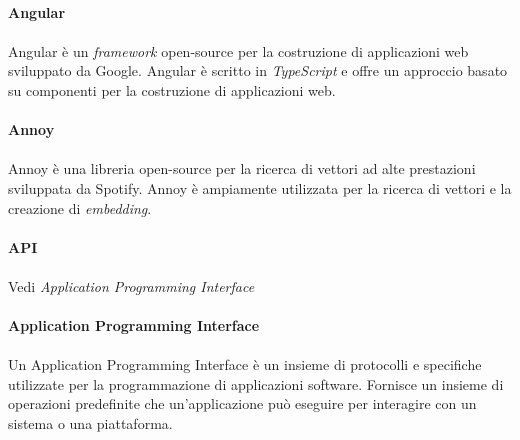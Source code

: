 \documentclass[10pt, a4paper]{article}
\begin{document}
\vspace{2em}
\paragraph{Angular}\noindent\hrulefill
\paragraph{}Angular è un \textit{framework\pg} open-source per la costruzione di applicazioni web sviluppato da Google. Angular è scritto in \textit{TypeScript\pg} e offre un approccio basato su componenti per la costruzione di applicazioni web.

\vspace{2em}
\paragraph{Annoy}\noindent\hrulefill
\paragraph{}Annoy è una libreria open-source per la ricerca di vettori ad alte prestazioni sviluppata da Spotify. Annoy è ampiamente utilizzata per la ricerca di vettori e la creazione di \textit{embedding\pg}.

\vspace{2em}
\paragraph{API}\noindent\hrulefill
\paragraph{}Vedi \textit{Application Programming Interface\pg}

\vspace{2em}
\paragraph{Application Programming Interface}\noindent\hrulefill
\paragraph{}Un Application Programming Interface è un insieme di protocolli e specifiche utilizzate per la programmazione di applicazioni software. Fornisce un insieme di operazioni predefinite che un'applicazione può eseguire per interagire con un sistema o una piattaforma.
\end{document}
